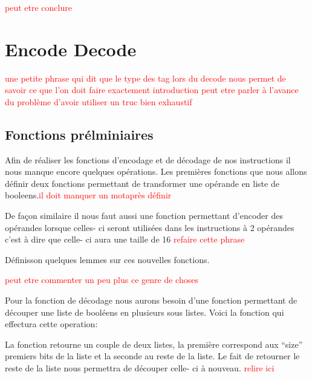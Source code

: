 \documentclass {article}
\newcommand{\codefrom}[3]
           {}
\theoremstyle{definition}
\theoremstyle{remark}
\newcommand{\todo}[1]{\textcolor{red}{#1}}
\begin{document}
\todo{peut etre conclure}


\section{Encode Decode}
\label{Encode Decode}

\todo{une petite phrase qui dit que le type des tag lors du decode nous permet de savoir ce que l'on doit faire exactement}
\todo{introduction peut etre parler à l'avance du problème d'avoir utiliser un truc bien exhaustif}



\subsection{Fonctions prélminiaires}

Afin de réaliser les fonctions d'encodage et de décodage de nos instructions il nous manque encore quelques opérations.
Les premières fonctions que nous allons définir deux fonctions permettant de transformer une opérande en liste de booleens.\todo{il doit manquer un motaprès définir}

\codefrom{src}{encode}{operand_to_bin}

De façon similaire il nous faut aussi une fonction permettant d'encoder des opérandes lorsque celles- ci seront utilisées dans
les instructions à 2 opérandes c'est à dire que celle- ci aura une taille de 16 \todo{refaire cette phrase}

\codefrom{src}{encode}{operand_to_bin_double}

Définisson quelques lemmes sur ces nouvelles fonctions.
\codefrom{src}{encode}{operand_to_bin_hypothesis_reg}
\codefrom{src}{encode}{operand_to_bin_hypothesis_imm}
\codefrom{src}{encode}{operand_to_bin_size}
\todo{peut etre commenter un peu plus ce genre de choses}


Pour la fonction de décodage nous aurons besoin d'une fonction permettant de découper
une liste de booléens en plusieurs sous listes. Voici la fonction qui effectura cette operation:

\codefrom{src}{encode}{get_first_n_bit}

La fonction retourne un couple de deux listes, la première correspond aux ``size'' premiers
bits de la liste et la seconde au reste  de la liste. Le fait de retourner le reste de la liste
nous permettra de découper celle- ci à nouveau.
\todo{relire ici}
\end{document}
